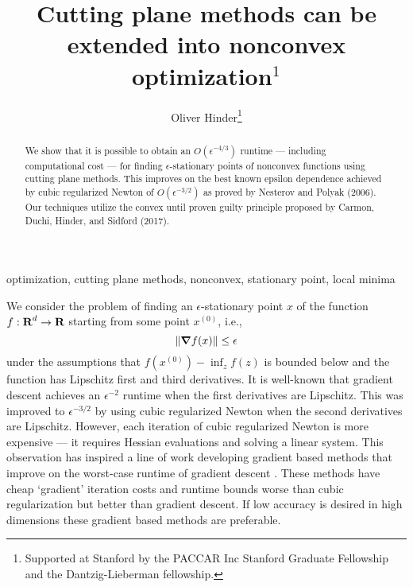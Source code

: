 \documentclass[12pt,final]{colt2018} %
\title{Cutting plane methods can be extended into nonconvex optimization$^1$}
\author{Oliver Hinder\thanks{Supported at Stanford by the PACCAR Inc Stanford Graduate Fellowship and the Dantzig-Lieberman fellowship.}}
\newcommand{\reals}{{\mbox{\bf R}}}
\newcommand\ind[1]{^{(#1)}}
\def\Dim{d}
\def\cite{\citet}
\begin{document}
\maketitle

\addtocounter{footnote}{1}

\begin{abstract}
We show that it is possible to obtain an $O(\epsilon^{-4/3})$ runtime --- including computational cost --- for finding $\epsilon$-stationary points of nonconvex functions using cutting plane methods. This improves on the best known epsilon dependence achieved by cubic regularized Newton of $O(\epsilon^{-3/2})$ as proved by Nesterov and Polyak (2006)\nocite{nesterov2006cubic}. Our techniques utilize the convex until proven guilty principle proposed by Carmon, Duchi, Hinder, and Sidford (2017)\nocite{carmon2017convex}.
\end{abstract}

\begin{keywords}
optimization, cutting plane methods, nonconvex, stationary point, local minima
\end{keywords}

\vspace{0.5cm}
\noindent We consider the problem of finding an $\epsilon$-stationary point $x$ of the function $f : \reals^{\Dim} \rightarrow \reals$ starting from some point $x\ind{0}$, i.e.,
$$\| \grad f(x) \| \le \epsilon$$
under the assumptions that $f(x\ind{0}) - \inf_{z} f(z)$ is bounded below and the function has Lipschitz first and third derivatives. It is well-known that gradient descent achieves an $\epsilon^{-2}$ runtime when the first derivatives are Lipschitz. This was improved to $\epsilon^{-3/2}$ by \cite{nesterov2006cubic} using cubic regularized Newton when the  second derivatives are Lipschitz. However, each iteration of cubic regularized Newton is more expensive --- it requires Hessian evaluations and solving a linear system. This observation has inspired a line of work developing gradient based methods that improve on the worst-case runtime of gradient descent \citep*{agarwal2016finding,carmon2016accelerated,carmon2017convex,jin2017accelerated,royer2017complexity}. These methods have cheap `gradient' iteration costs and runtime bounds worse than cubic regularization but better than gradient descent. If low accuracy is desired in high dimensions these gradient based methods are preferable.
\end{document}
